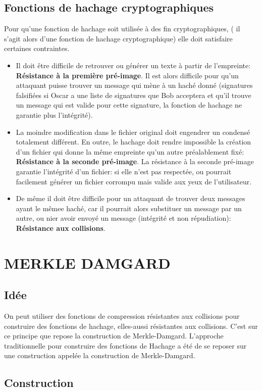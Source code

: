 \documentclass[10.5pt, a4paper, twoside, openright]{report}
\begin{document}
\section{Fonctions de hachage cryptographiques} 
Pour qu’une fonction de hachage soit utilisée à des fin cryptographiques, ( il s’agit alors d’une fonction de hachage cryptographique) elle doit satisfaire certaines contraintes.
\begin{itemize}
\item{Il doit être difficile de retrouver ou générer un texte à partir de l’empreinte: \textbf{Résistance à la première pré-image}.
Il est alors difficile pour qu’un attaquant puisse trouver un message qui mène à un haché donné 	(signatures falsifiées si Oscar a une liste de signatures que Bob acceptera et qu’il trouve un message qui est valide pour cette signature, la fonction de hachage ne garantie plus l’intégrité).}
\item{La moindre modification dans le fichier original doit engendrer un condensé totalement différent. En outre, le hachage doit rendre impossible la création d’un fichier qui donne la même empreinte qu’un autre préalablement fixé: \textbf{Résistance à la seconde pré-image}. 
La résistance à la seconde pré-image garantie l’intégrité d’un fichier: si elle n’est pas respectée, ou pourrait facilement générer un fichier corrompu mais valide aux yeux de l’utilisateur.}
\item{De même il doit être difficile pour un attaquant de trouver deux messages ayant le mêmee haché, car il pourrait alors substituer un message par un autre, ou nier avoir envoyé un message (intégrité et non répudiation): \textbf{Résistance aux collisions}.}
\end{itemize}


\chapter{MERKLE DAMGARD}
\section{Idée}
On peut utiliser des fonctions de compression résistantes aux collisions pour construire des fonctions de hachage, elles-aussi résistantes aux collisions.
C’est sur ce principe que repose la construction de Merkle-Damgard.
L’approche traditionnelle pour construire des fonctions de Hachage a été de se reposer sur une construction appelée la construction de Merkle-Damgard.
\section{Construction}
\end{document}
